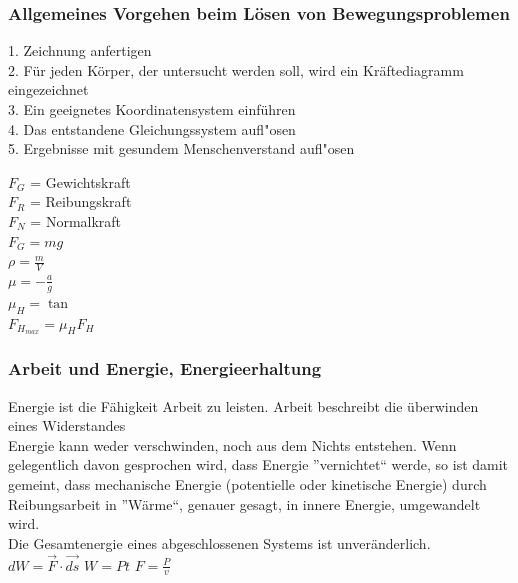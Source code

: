 \subsubsection{Allgemeines Vorgehen beim Lösen von Bewegungsproblemen}
\begin{multicols}{2}
1.   Zeichnung anfertigen \\
2. 	 Für jeden Körper, der untersucht werden soll, wird ein Kräftediagramm eingezeichnet \\
3. 	 Ein geeignetes Koordinatensystem einführen \\
4. 	 Das entstandene Gleichungssystem aufl"osen \\
5. 	 Ergebnisse mit gesundem Menschenverstand aufl"osen \\
\columnbreak
\begin{multicols}{2}
$F_{G}$ = Gewichtskraft \\
$F_{R}$ = Reibungskraft \\
$F_{N}$ = Normalkraft \\
$F_{G} = mg$ \\
$\rho = \frac{m}{V}$ \\
$\mu = - \frac{a}{g}$ \\
$\mu_{H} = \tan{}$ \\
$F_{H_{max}} = \mu_{H}F_{H}$ \\ 
\columnbreak
{}
\end{multicols}
\end{multicols}
%
%

\subsubsection{Arbeit und Energie, Energieerhaltung}
Energie ist die Fähigkeit Arbeit zu leisten. Arbeit beschreibt die überwinden eines Widerstandes \\
Energie kann weder verschwinden, noch aus dem Nichts entstehen. 
Wenn gelegentlich davon gesprochen wird, dass Energie 
”vernichtet“ werde, so ist damit gemeint, dass mechanische Energie 
(potentielle oder kinetische Energie) durch Reibungsarbeit in 
”Wärme“, genauer gesagt, in innere Energie, umgewandelt wird. \\
Die Gesamtenergie eines abgeschlossenen Systems ist 
unveränderlich. \\
$dW = \overrightarrow{F} \cdot \overrightarrow{ds}$
$W = Pt$
$F = \frac{P}{v}$

